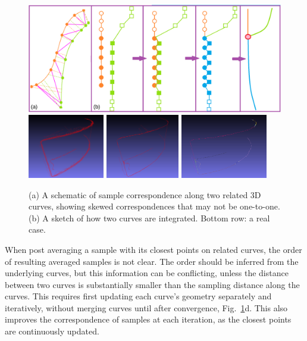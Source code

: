 \documentclass[a4paper,titlepage]{article}
\begin{document}
\begin{figure}[htbp]
	\begin{center}
		\centering
		\includegraphics[width=0.86\linewidth]{figs/graph-organization-caption.pdf}
		\includegraphics[height=2.8cm]{figs/cluster32-1.png}
		\includegraphics[height=2.8cm]{figs/cluster32-after1.png}
		\includegraphics[height=2.8cm]{figs/cluster32-merged1.png}
	\end{center}
	\caption{\small (a) A schematic of sample correspondence along two related 3D
		curves, showing skewed correspondences that may not be one-to-one. (b) A
		sketch of how two curves are integrated. Bottom row: a real case.
	}
	\label{fig:graph:organization}
\end{figure}

When post averaging a sample with its closest points on related curves, the
order of resulting averaged samples is not clear.  The order should be inferred
from the underlying curves, but this information can be
conflicting, unless the distance between two curves is substantially smaller
than the sampling distance along the curves. This requires
first updating each curve's geometry separately and iteratively, without
merging curves until after convergence,
Fig.~\ref{fig:graph:organization}d. This also improves the correspondence of
samples at each iteration, as the closest points are continuously updated. 
\end{document}
